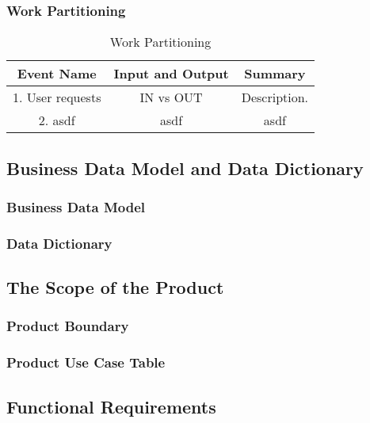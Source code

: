 \documentclass[12pt, titlepage]{article}
\begin{document}
\subsubsection{Work Partitioning} 
\begin{table}
\centering
\begin{tabular}{|c|c|c|}
\hline
\textbf{Event Name}  & \textbf{Input and Output} & \textbf{Summary} \\ 
\hline
1. User requests & IN vs OUT & Description. \\ 
\hline
2. asdf & asdf & asdf \\
\hline
\end{tabular}
\caption{Work Partitioning}
\end{table}

\subsection{Business Data Model and Data Dictionary}
\subsubsection{Business Data Model}
\subsubsection{Data Dictionary}
\subsection{The Scope of the Product}
\subsubsection{Product Boundary}
\subsubsection{Product Use Case Table}
\subsection{Functional Requirements}
\end{document}
